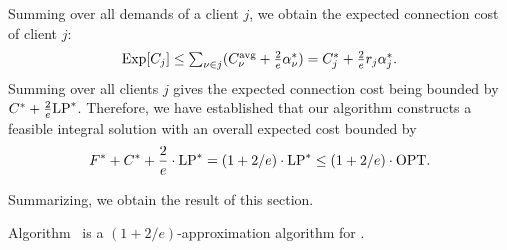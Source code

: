 Summing over all demands of a client $j$, we obtain the
expected connection cost of client $j$:
%
\begin{equation*}
  \mbox{\rm Exp}[C_j] \leq {\textstyle\sum_{\nu\in j} (C^{{\mbox{\scriptsize\rm avg}}}_{\nu} + \frac{2}{e}\alpha_{\nu}^\ast) }
  = \textstyle{ C_j^\ast + \frac{2}{e}r_j\alpha_j^\ast}.
\end{equation*}
%
Summing over all clients $j$ gives the expected connection
cost being bounded by $C^\ast +
\frac{2}{e}\mbox{\rm LP}^\ast$. Therefore, we have established that
our algorithm constructs a feasible integral solution with
an overall expected cost bounded by
%
\begin{equation*}
  \label{eq:chudakall}
  	F^\ast + C^\ast + \frac{2}{e}\cdot \mbox{\rm LP}^\ast = (1+2/e)\cdot \mbox{\rm LP}^\ast
  \leq (1+2/e)\cdot \mbox{\rm OPT}.
\end{equation*}

Summarizing, we obtain the result of this section.

\begin{theorem}\label{thm:1736}
  Algorithm~{\ECHS} is a $(1+2/e)$-approximation algorithm for \FTFP.
\end{theorem}